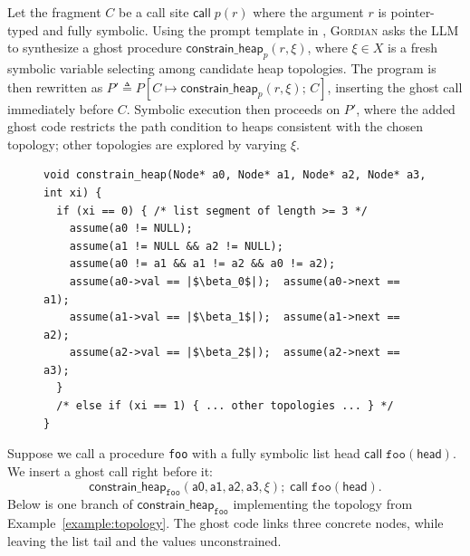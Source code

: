 \documentclass[acmsmall,screen,nonacm]{acmart}
\newcommand{\projName}{\textsc{Gordian}\xspace}
\theoremstyle{definition}
\begin{document}
Let the fragment \(C\) be a call site \(\mathsf{call}\;p(r)\) where the argument
\(r\) is pointer-typed and fully symbolic. Using the prompt template in
, \projName{} asks the LLM to synthesize a ghost
procedure \(\mathsf{constrain\_heap}_p(r,\xi)\), where \(\xi \in X\) is a fresh
symbolic variable selecting among candidate heap topologies. The program is then
rewritten as \(P' \triangleq P[C \mapsto \mathsf{constrain\_heap}_p(r,\xi);\,C]\),
inserting the ghost call immediately before \(C\).
Symbolic execution then proceeds on $P'$, where the added ghost code restricts
the path condition to heaps consistent with the chosen topology; other
topologies are explored by varying $\xi$.

\begin{figure}
\vspace{-4mm}
{\scriptsize
\begin{verbatim}
void constrain_heap(Node* a0, Node* a1, Node* a2, Node* a3, int xi) {
  if (xi == 0) { /* list segment of length >= 3 */
    assume(a0 != NULL);
    assume(a1 != NULL && a2 != NULL);
    assume(a0 != a1 && a1 != a2 && a0 != a2);
    assume(a0->val == |$\beta_0$|);  assume(a0->next == a1);
    assume(a1->val == |$\beta_1$|);  assume(a1->next == a2);
    assume(a2->val == |$\beta_2$|);  assume(a2->next == a3);
  }
  /* else if (xi == 1) { ... other topologies ... } */
}
\end{verbatim}
}
\vspace{-4mm}
\end{figure}
\begin{example}
Suppose we call a procedure \texttt{foo} with a fully symbolic list head $\mathsf{call}\;\texttt{foo}(\mathsf{head}).$ We insert a ghost call right before it:
\[
\mathsf{constrain\_heap}_{\texttt{foo}}(\mathsf{a0},\mathsf{a1},\mathsf{a2},\mathsf{a3},\xi);\;
\mathsf{call}\;\texttt{foo}(\mathsf{head}).
\]
Below is one branch of $\mathsf{constrain\_heap}_{\texttt{foo}}$ implementing
the topology from Example~\ref{example:topology}. The ghost code links three concrete nodes, while leaving the list tail and the values unconstrained.
\end{example}
\end{document}

